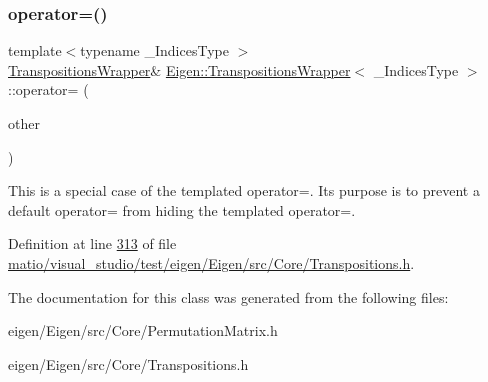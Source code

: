 \subsubsection{\texorpdfstring{operator=()}{operator=()}\hspace{0.1cm}{\footnotesize\ttfamily [4/4]}}
{\footnotesize\ttfamily template$<$typename \+\_\+\+Indices\+Type $>$ \\
\hyperlink{class_eigen_1_1_transpositions_wrapper}{Transpositions\+Wrapper}\& \hyperlink{class_eigen_1_1_transpositions_wrapper}{Eigen\+::\+Transpositions\+Wrapper}$<$ \+\_\+\+Indices\+Type $>$\+::operator= (\begin{DoxyParamCaption}\item[{const \hyperlink{class_eigen_1_1_transpositions_wrapper}{Transpositions\+Wrapper}$<$ \+\_\+\+Indices\+Type $>$ \&}]{other }\end{DoxyParamCaption})\hspace{0.3cm}{\ttfamily [inline]}}

This is a special case of the templated operator=. Its purpose is to prevent a default operator= from hiding the templated operator=. 

Definition at line \hyperlink{matio_2visual__studio_2test_2eigen_2_eigen_2src_2_core_2_transpositions_8h_source_l00313}{313} of file \hyperlink{matio_2visual__studio_2test_2eigen_2_eigen_2src_2_core_2_transpositions_8h_source}{matio/visual\+\_\+studio/test/eigen/\+Eigen/src/\+Core/\+Transpositions.\+h}.



The documentation for this class was generated from the following files\+:\begin{DoxyCompactItemize}
\item 
eigen/\+Eigen/src/\+Core/\+Permutation\+Matrix.\+h\item 
eigen/\+Eigen/src/\+Core/\+Transpositions.\+h\end{DoxyCompactItemize}

